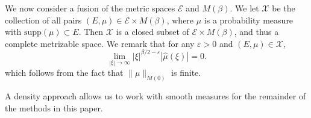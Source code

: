 \documentclass[12pt,reqno]{article}
\numberwithin{equation}{section}
\newtheorem{theorem}{Theorem}
\begin{document}
We now consider a fusion of the metric spaces $\mathcal{E}$ and $M(\beta)$. We let $\mathcal{X}$ be the collection of all pairs $(E,\mu) \in \mathcal{E} \times M(\beta)$, where $\mu$ is a probability measure with $\text{supp}(\mu) \subset E$. Then $\mathcal{X}$ is a closed subset of $\mathcal{E} \times M(\beta)$, and thus a complete metrizable space. We remark that for any $\varepsilon > 0$ and $(E,\mu) \in \mathcal{X}$,
%
\begin{equation} \label{equationGFSCSC4}
    \lim_{|\xi| \to \infty} |\xi|^{\beta/2 - \varepsilon} |\widehat{\mu}(\xi)| = 0.
\end{equation}
%
which follows from the fact that $\| \mu \|_{M(0)}$ is finite.
\begin{comment}
\begin{theorem}
    $\mathcal{X}$ is a closed subset of $\mathcal{E} \times M(\beta)$.
\end{theorem}
\begin{proof}
    Suppose $\{ (E_k,\mu_k) \}$ is a sequence of elements of $\mathcal{X}$ converging to some tuple $(E,\mu) \in \mathcal{E} \times M(\beta)$. Fix $\varepsilon > 0$. Since $E_k \to E$ in the Hausdorff dimension, there exists $k_0$ such that for $k \geq k_0$, $E_k \subset E(\varepsilon)$. Since $\mu_k \to \mu$ weakly, this implies that $\mu$ is a probability measure, and that $\text{supp}(\mu) \subset E(\varepsilon)$. Taking $\varepsilon \to 0$ shows that $\text{supp}(\mu) \subset E$. Again for a fixed $\varepsilon > 0$, applying the triangle inequality and the reverse triangle inequality combined with \eqref{equationGFSCSC4} applied to $\mu_k$, we conclude
    \[ \lim_{|\xi| \to \infty} |\xi|^{\beta/2 - \varepsilon} |\widehat{\mu}(\xi)| = \lim_{|\xi| \to \infty} |\xi|^{\beta/2 - \varepsilon} |\widehat{\mu}(\xi) - \widehat{\mu_k}(\xi)| \leq \| \mu - \mu_k \|_{M(\beta,\varepsilon)}. \]
    Taking $k \to \infty$ shows that
    \[ \lim_{|\xi| \to \infty} |\xi|^{\beta/2 - \varepsilon} |\widehat{\mu}(\xi)| = 0, \]
    which completes the proof.
\end{proof}
\end{comment}

A density approach allows us to work with smooth measures for the remainder of the methods in this paper.
\end{document}
